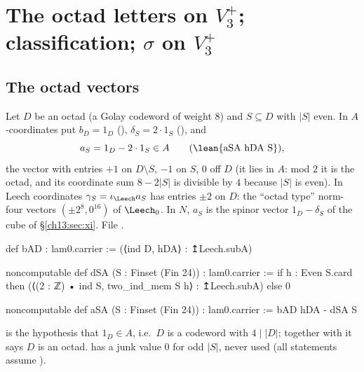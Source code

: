 \section{\texorpdfstring{The octad letters on $V_3^+$; classification; $\sigma$ on $V_3^+$}{The octad letters on V3+; classification; sigma on V3+}}\label{ch13:sec:octad}

\subsection{The octad vectors}
Let $D$ be an octad (a Golay codeword of weight $8$) and $S\subseteq D$ with $|S|$ even. In $A$-coordinates put
$b_D=1_D$ (), $\delta_S=2\cdot1_S$ (), and
\begin{equation*}
  a_S=1_D-2\cdot1_S\in A\qquad(\text{\lean{aSA hDA S}}),
\end{equation*}
the vector with entries $+1$ on $D\setminus S$, $-1$ on $S$, $0$ off $D$ (it lies in $A$: mod $2$ it is the octad,
and its coordinate sum $8-2|S|$ is divisible by $4$ because $|S|$ is even). In Leech coordinates
$\gamma_S=\iota_\Leech a_S$ has entries $\pm2$ on $D$: the ``octad type'' norm-four vectors $(\pm2^8,0^{16})$ of
$\Leech_0$. In $N$, $a_S$ is the spinor vector $1_D-\delta_S$ of the cube of \S\ref{ch13:sec:xi}.
\noindent File .
\begin{leancode}
def bAD : lam0.carrier := (⟨ind D, hDA⟩ : ↥Leech.subA)

noncomputable def dSA (S : Finset (Fin 24)) : lam0.carrier :=
  if h : Even S.card then (⟨(2 : ℤ) • ind S, two_ind_mem S h⟩ : ↥Leech.subA) else 0

noncomputable def aSA (S : Finset (Fin 24)) : lam0.carrier := bAD hDA - dSA S
\end{leancode}
\begin{dictionary}
 is the hypothesis that $1_D\in A$, i.e.\ $D$ is a codeword with $4\mid|D|$;
together with  it says $D$ is an octad.  has a junk value $0$ for odd
$|S|$, never used (all statements assume ).
\end{dictionary}

